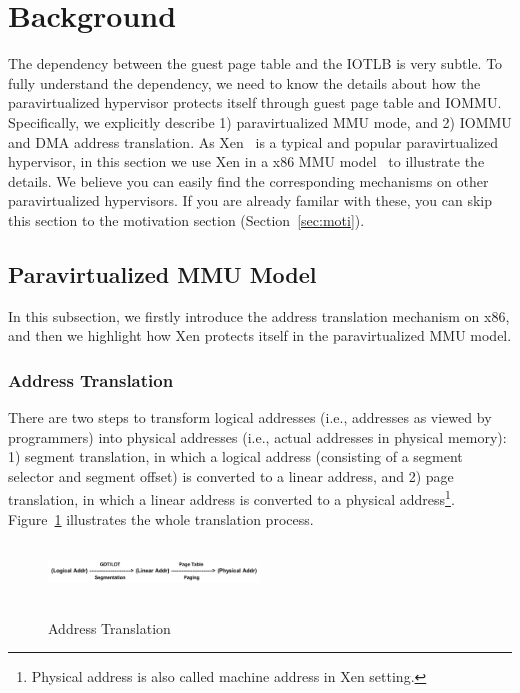 \section{Background} \label{sec:background}
The dependency between the guest page table and the IOTLB is very subtle.
To fully understand the dependency, we need to know the details about how the paravirtualized hypervisor protects itself through guest page table and IOMMU.
Specifically, we explicitly describe 1) paravirtualized MMU mode, and 2) IOMMU and DMA address translation.
As Xen~\cite{XEN-SOSP03} is a typical and popular paravirtualized hypervisor, in this section we use Xen in a x86 MMU model~\cite{x86-pv-model} to illustrate the details. We believe you can easily find the corresponding mechanisms on other paravirtualized hypervisors.
If you are already familar with these, you can skip this section to the motivation section (Section~\ref{sec:moti}).



\subsection{Paravirtualized MMU Model}\label{sec:pvmodel}
In this subsection, we firstly introduce the address translation mechanism on x86, and then we highlight how Xen protects itself in the paravirtualized MMU model.

\subsubsection{Address Translation}\label{sec:addr-trans}
There are two steps to transform logical addresses (i.e., addresses as viewed by programmers) into physical addresses (i.e., actual addresses in physical memory):
1) segment translation, in which a logical address (consisting of a segment selector and segment offset) is converted to a linear address,
and 2) page translation, in which a linear address is converted to a physical address\footnote{Physical address is also called machine address in Xen setting.}.
Figure~\ref{fig:address-translation} illustrates the whole translation process.
\begin{figure}[ht]
\centering
\includegraphics[height=1.5cm, width=0.5\textwidth]{image/background/address-translation.png} \\
\caption{Address Translation}
\label{fig:address-translation}
\end{figure}


